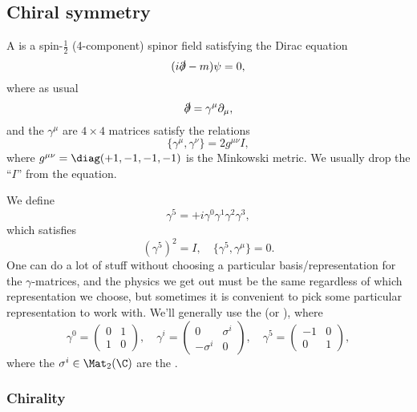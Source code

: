 \documentclass[a4paper]{article}
\begin{document}
\subsection{Chiral symmetry}
A  is a spin-$\frac{1}{2}$ (4-component) spinor field satisfying the Dirac equation
\[
  (i \slashed{\partial} - m) \psi = 0,
\]
where as usual
\[
  \slashed{\partial} = \gamma^\mu \partial_\mu,
\]
and the \index{$\gamma^\mu$} $\gamma^\mu$ are $4 \times 4$ matrices satisfy the  relations
\[
  \{\gamma^\mu, \gamma^\nu\} = 2 g^{\mu\nu} I,
\]
where $g^{\mu\nu} = \diag(+1, -1, -1, -1)$ is the Minkowski metric. We usually drop the ``$I$'' from the equation.

We define
\[
  \gamma^5 = +i \gamma^0 \gamma^1 \gamma^2 \gamma^3,
\]
which satisfies
\[
  (\gamma^5)^2 = I,\quad \{\gamma^5, \gamma^\mu\} = 0.
\]
One can do a lot of stuff without choosing a particular basis/representation for the $\gamma$-matrices, and the physics we get out must be the same regardless of which representation we choose, but sometimes it is convenient to pick some particular representation to work with. We'll generally use the  (or ), where
\[
  \gamma^0 =
  \begin{pmatrix}
    0 & 1 \\
    1 & 0
  \end{pmatrix}, \quad
  \gamma^i =
  \begin{pmatrix}
    0 & \sigma^i\\
    -\sigma^i & 0
  \end{pmatrix},\quad
  \gamma^5 =
  \begin{pmatrix}
    -1 & 0\\
    0 & 1
  \end{pmatrix},
\]
where the $\sigma^i \in \Mat_2(\C)$ are the .

\subsubsection*{Chirality}
\end{document}
